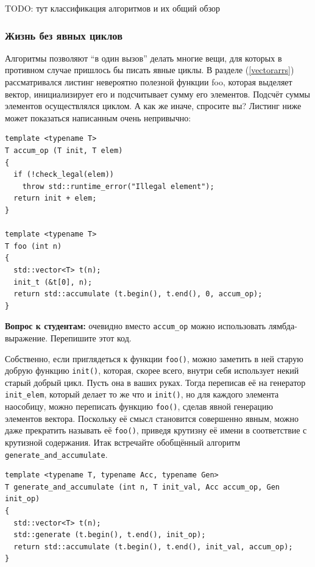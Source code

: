 \documentclass[a4paper,12pt,oneside]{article}
\newif\ifanswers
\begin{document}
TODO: тут классификация алгоритмов и их общий обзор

\subsubsection{Жизнь без явных циклов}

Алгоритмы позволяют ``в один вызов'' делать многие вещи, для которых в противном случае пришлось бы писать явные циклы. В разделе (\ref{vectorarrs}) рассматривался листинг невероятно полезной функции foo, которая выделяет вектор, инициализирует его и подсчитывает сумму его элементов. Подсчёт суммы элементов осуществлялся циклом. А как же иначе, спросите вы? Листинг ниже может показаться написанным очень непривычно:

\begin{lstlisting}
template <typename T>
T accum_op (T init, T elem)
{
  if (!check_legal(elem))
    throw std::runtime_error("Illegal element");
  return init + elem;
}

template <typename T>
T foo (int n)
{
  std::vector<T> t(n);
  init_t (&t[0], n);
  return std::accumulate (t.begin(), t.end(), 0, accum_op);
}
\end{lstlisting}

\textbf{Вопрос к студентам:} очевидно вместо \lstinline!accum_op! можно использовать лямбда-выражение. Перепишите этот код.

\ifanswers
Верный ответ: например
\begin{lstlisting}
return std::accumulate (t.begin(), t.end(), 0, 
           [](T init, T elem){return init + elem;});
\end{lstlisting}
\fi

Собственно, если приглядеться к функции \lstinline!foo()!, можно заметить в ней старую добрую функцию \lstinline!init()!, которая, скорее всего, внутри себя использует некий старый добрый цикл. Пусть она в ваших руках. Тогда переписав её на генератор \lstinline!init_elem!, который делает то же что и \lstinline!init()!, но для каждого элемента наособицу, можно переписать функцию \lstinline!foo()!, сделав явной генерацию элементов вектора. Поскольку её смысл становится совершенно явным, можно даже прекратить называть её \lstinline!foo()!, приведя крутизну её имени в соответствие с крутизной содержания. Итак встречайте обобщённый алгоритм \lstinline!generate_and_accumulate!.

\begin{lstlisting}
template <typename T, typename Acc, typename Gen>
T generate_and_accumulate (int n, T init_val, Acc accum_op, Gen init_op)
{
  std::vector<T> t(n);
  std::generate (t.begin(), t.end(), init_op);
  return std::accumulate (t.begin(), t.end(), init_val, accum_op);
}
\end{lstlisting}
\end{document}
